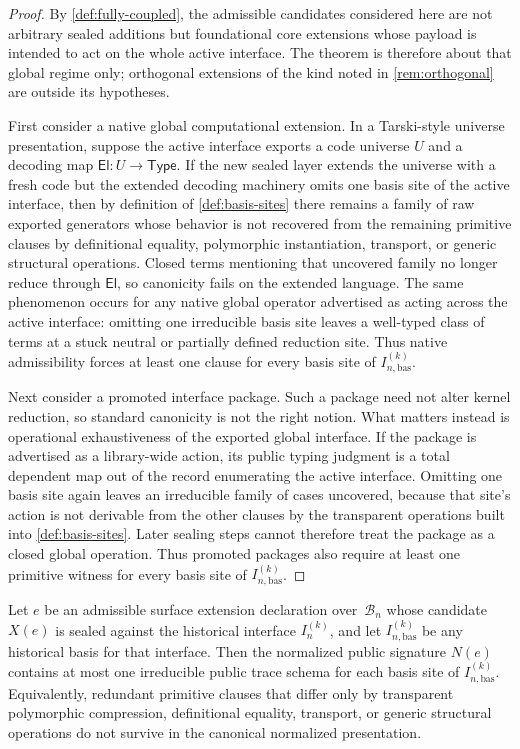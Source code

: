 \documentclass{lmcs}
\newcommand{\B}{\mathcal{B}}
\begin{document}
\begin{proof}
By \autoref{def:fully-coupled}, the admissible candidates considered here are not arbitrary sealed additions but foundational core extensions whose payload is intended to act on the whole active interface. The theorem is therefore about that global regime only; orthogonal extensions of the kind noted in \autoref{rem:orthogonal} are outside its hypotheses.

First consider a native global computational extension. In a Tarski-style universe presentation, suppose the active interface exports a code universe $U$ and a decoding map $\mathsf{El} : U \to \mathsf{Type}$. If the new sealed layer extends the universe with a fresh code but the extended decoding machinery omits one basis site of the active interface, then by definition of \autoref{def:basis-sites} there remains a family of raw exported generators whose behavior is not recovered from the remaining primitive clauses by definitional equality, polymorphic instantiation, transport, or generic structural operations. Closed terms mentioning that uncovered family no longer reduce through $\mathsf{El}$, so canonicity fails on the extended language. The same phenomenon occurs for any native global operator advertised as acting across the active interface: omitting one irreducible basis site leaves a well-typed class of terms at a stuck neutral or partially defined reduction site. Thus native admissibility forces at least one clause for every basis site of $I_{n,\mathrm{bas}}^{(k)}$.

Next consider a promoted interface package. Such a package need not alter kernel reduction, so standard canonicity is not the right notion. What matters instead is operational exhaustiveness of the exported global interface. If the package is advertised as a library-wide action, its public typing judgment is a total dependent map out of the record enumerating the active interface. Omitting one basis site again leaves an irreducible family of cases uncovered, because that site's action is not derivable from the other clauses by the transparent operations built into \autoref{def:basis-sites}. Later sealing steps cannot therefore treat the package as a closed global operation. Thus promoted packages also require at least one primitive witness for every basis site of $I_{n,\mathrm{bas}}^{(k)}$.
\end{proof}

\begin{prop}
\label{prop:basis-minimality}
Let $e$ be an admissible surface extension declaration over~$\B_n$ whose
candidate $X(e)$ is sealed against the historical interface $I_n^{(k)}$, and
let $I_{n,\mathrm{bas}}^{(k)}$ be any historical basis for that interface.
Then the normalized public signature $N(e)$ contains at most one irreducible
public trace schema for each basis site of $I_{n,\mathrm{bas}}^{(k)}$.
Equivalently, redundant primitive clauses that differ only by transparent
polymorphic compression, definitional equality, transport, or generic
structural operations do not survive in the canonical normalized
presentation.
\end{prop}
\end{document}

